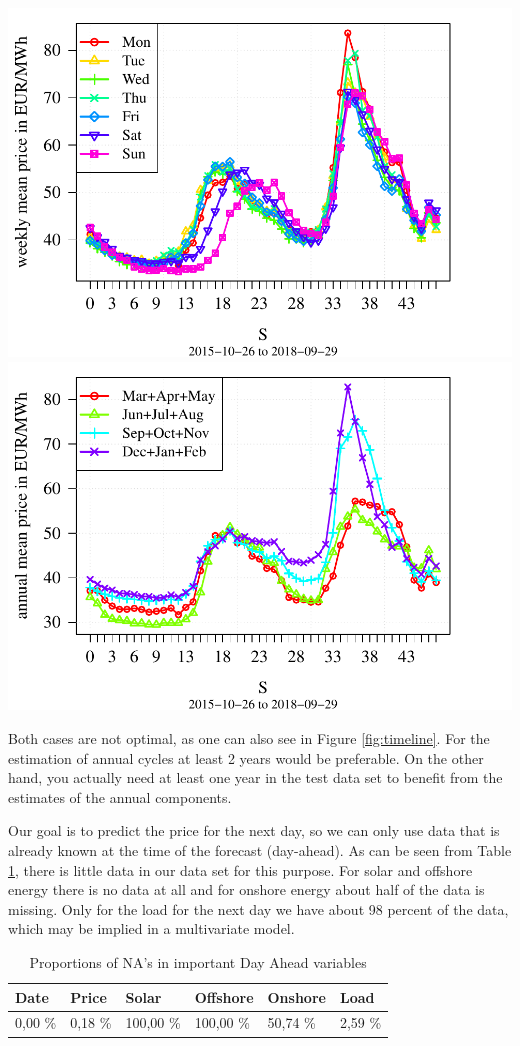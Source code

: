 \documentclass[12pt,a4paper]{article}
\let\origfigure\figure
\let\endorigfigure\endfigure
\renewenvironment{figure}[1][2] {
    \expandafter\origfigure\expandafter[H]
} {
    \endorigfigure
}
\begin{document}
\FloatBarrier
\begin{figure}

{\centering \includegraphics[width=0.45\linewidth]{term_paper_eem_files/figure-latex/unnamed-chunk-2-1} \includegraphics[width=0.45\linewidth]{term_paper_eem_files/figure-latex/unnamed-chunk-2-2} 

}

\caption{ \label{fig:structure} Mean Values Weekdays and quarters of the year  }\label{fig:unnamed-chunk-2}
\end{figure}
\FloatBarrier

Both cases are not optimal, as one can also see in Figure
\ref{fig:timeline}. For the estimation of annual cycles at least 2 years
would be preferable. On the other hand, you actually need at least one
year in the test data set to benefit from the estimates of the annual
components.

Our goal is to predict the price for the next day, so we can only use
data that is already known at the time of the forecast (day-ahead). As
can be seen from Table \ref{tab:data}, there is little data in our data
set for this purpose. For solar and offshore energy there is no data at
all and for onshore energy about half of the data is missing. Only for
the load for the next day we have about 98 percent of the data, which
may be implied in a multivariate model.

\begin{table}[]
\centering
\begin{tabular}{@{}llllll@{}}
\toprule
Date    & Price   & Solar     & Offshore  & Onshore  & Load    \\ \midrule
0,00 \% & 0,18 \% & 100,00 \% & 100,00 \% & 50,74 \% & 2,59 \% \\ \bottomrule
\end{tabular}
\caption{Proportions of NA's in important Day Ahead variables}
\label{tab:data}
\end{table}
\end{document}
